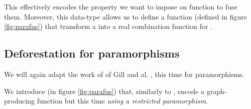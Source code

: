 This effectively encodes the property we want to impose on function to fuse them. Moreover, this data-type allows us to define a function  (defined in figure \ref{fig:parafus}) that transform a  into a real combination function for .

\subsection{Deforestation for paramorphisms}
\label{sec:defor-para}

We will again adapt the work of of Gill and al. \cite{Gill:1993:SCD:165180.165214}, this time for paramorphisms.

We introduce  (in figure \ref{fig:parafus}) that, similarly to , encode a graph-producing function but this time \emph{using a restricted paramorphism}.



